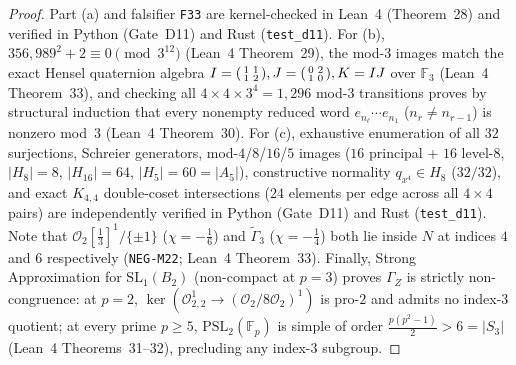 \documentclass[11pt]{amsart}
\numberwithin{equation}{section}
\theoremstyle{plain}
\theoremstyle{definition}\newtheorem{definition}[theorem]{Definition}
\theoremstyle{remark}\newtheorem{remark}[theorem]{Remark}
\newcommand{\F}{\mathbb{F}}
\newcommand{\calO}{\mathcal{O}}
\newcommand{\PSL}{\mathrm{PSL}}
\newcommand{\SL}{\mathrm{SL}}
\begin{document}
\begin{proof}
Part (a) and falsifier \texttt{F33} are kernel-checked in Lean~4 (Theorem~28) and verified in Python (Gate~D11) and Rust (\texttt{test\_d11}). For (b), $356{,}989^2+2\equiv 0\pmod{3^{12}}$ (Lean~4 Theorem~29), the mod-$3$ images match the exact Hensel quaternion algebra $I=\begin{psmallmatrix}1&1\\1&2\end{psmallmatrix}, J=\begin{psmallmatrix}0&2\\1&0\end{psmallmatrix}, K=IJ$ over $\F_3$ (Lean~4 Theorem~33), and checking all $4\times 4\times 3^4=1{,}296$ mod-$3$ transitions proves by structural induction that every nonempty reduced word $e_{n_\ell}\cdots e_{n_1}$ ($n_r\ne n_{r-1}$) is nonzero mod~$3$ (Lean~4 Theorem~30). For (c), exhaustive enumeration of all $32$ surjections, Schreier generators, mod-$4$/$8$/$16$/$5$ images ($16$ principal + $16$ level-$8$, $|H_8|=8$, $|H_{16}|=64$, $|H_5|=60=|A_5|$), constructive normality $q_{x^4}\in H_8$ ($32/32$), and exact $K_{4,4}$ double-coset intersections ($24$ elements per edge across all $4\times 4$ pairs) are independently verified in Python (Gate~D11) and Rust (\texttt{test\_d11}). Note that $\calO_2[\frac13]^1/\{\pm 1\}$ ($\chi=-\frac16$) and $\tilde{\Gamma}_3$ ($\chi=-\frac14$) both lie inside $N$ at indices $4$ and $6$ respectively (\texttt{NEG-M22}; Lean~4 Theorem~33). Finally, Strong Approximation for $\SL_1(B_2)$ (non-compact at $p=3$) proves $\Gamma_Z$ is strictly non-congruence: at $p=2$, $\ker(\calO_{2,2}^1\to(\calO_2/8\calO_2)^1)$ is pro-$2$ and admits no index-$3$ quotient; at every prime $p\ge 5$, $\PSL_2(\F_p)$ is simple of order $\frac{p(p^2-1)}{2}>6=|S_3|$ (Lean~4 Theorems~31--32), precluding any index-$3$ subgroup.
\end{proof}
\end{document}
